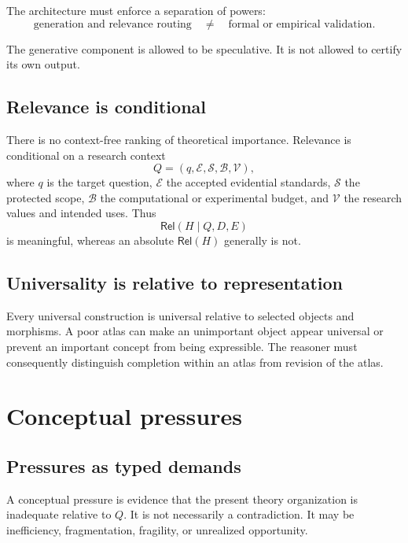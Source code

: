 \documentclass[11pt]{article}
\newcommand{\Rel}{\mathsf{Rel}}
\begin{document}
The architecture must enforce a separation of powers:
\begin{equation}
\text{generation and relevance routing}
\quad\neq\quad
\text{formal or empirical validation}.
\end{equation}

The generative component is allowed to be speculative. It is not allowed to certify its own output.

\subsection{Relevance is conditional}

There is no context-free ranking of theoretical importance. Relevance is conditional on a research
context
\begin{equation}
Q=(q,\mathcal{E},\mathcal{S},\mathcal{B},\mathcal{V}),
\end{equation}
where $q$ is the target question, $\mathcal{E}$ the accepted evidential standards, $\mathcal{S}$ the
protected scope, $\mathcal{B}$ the computational or experimental budget, and $\mathcal{V}$ the
research values and intended uses. Thus
\begin{equation}
\Rel(H\mid Q,D,E)
\end{equation}
is meaningful, whereas an absolute $\Rel(H)$ generally is not.

\subsection{Universality is relative to representation}

Every universal construction is universal relative to selected objects and morphisms. A poor atlas can
make an unimportant object appear universal or prevent an important concept from being expressible.
The reasoner must consequently distinguish completion within an atlas from revision of the atlas.

\section{Conceptual pressures}

\subsection{Pressures as typed demands}

A conceptual pressure is evidence that the present theory organization is inadequate relative to $Q$.
It is not necessarily a contradiction. It may be inefficiency, fragmentation, fragility, or unrealized
opportunity.
\end{document}
